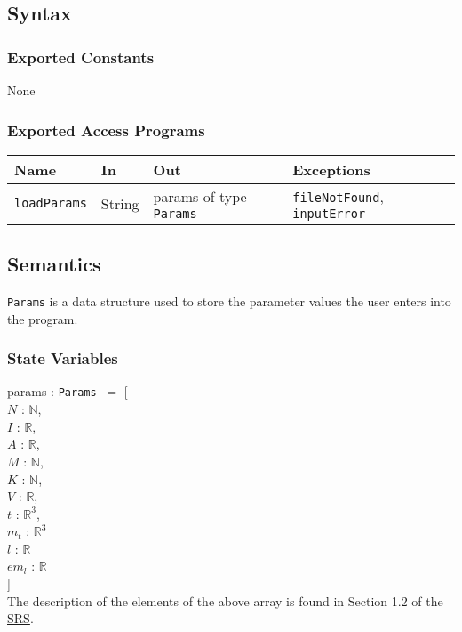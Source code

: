\documentclass[12pt, titlepage]{article}
\begin{document}
\subsection{Syntax}

\subsubsection{Exported Constants}
None 

\subsubsection{Exported Access Programs}
\begin{center}
\begin{tabular}{p{3cm} p{4cm} p{4cm} p{3cm}}
\hline
\textbf{Name} & \textbf{In} & \textbf{Out} & \textbf{Exceptions} \\
\hline
\texttt{loadParams} & String & params of type \texttt{Params} & \texttt{fileNotFound}, \texttt{inputError} \\
\hline
\end{tabular}
\end{center}

\subsection{Semantics}
\texttt{Params} is a data structure used to store the parameter values the user enters into the program. 
\subsubsection{State Variables}
params : \texttt{Params} $\:= $ [ \\ 
$N$ : $\mathbb{N}$, \\
$I$ : $\mathbb{R}$, \\
$A$ : $\mathbb{R}$, \\
$M$ : $\mathbb{N}$, \\
$K$ : $\mathbb{N}$, \\
$V$ : $\mathbb{R}$, \\
$t$ : $\mathbb{R}^3$, \\
$m_t$ : $\mathbb{R}^3$ \\
$l$ : $\mathbb{R}$ \\
$em_l$ : $\mathbb{R}$ \\
] \\
The description of the elements of the above array is found in Section 1.2 of the \href{https://github.com/husseinsd1/optimal-em-arrangement/blob/main/docs/SRS/SRS.pdf}{SRS}.
\end{document}
